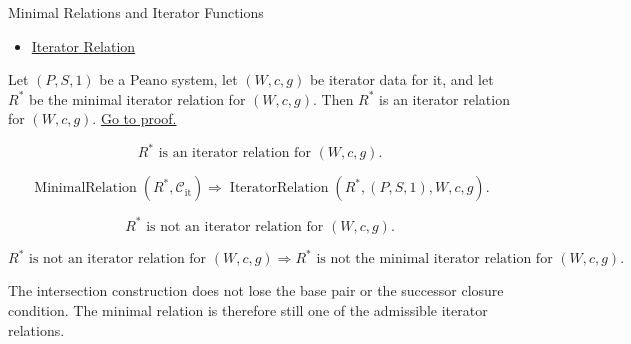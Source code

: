 \begin{topicbox}{Minimal Relations and Iterator Functions}
\begin{remark*}[Dependencies]
\begin{itemize}
  \item \hyperref[def:iterator-relation]{Iterator Relation}
\end{itemize}
\end{remark*}

\begin{tcolorbox}[colback=lembox, colframe=lemborder, arc=2pt,
  left=6pt, right=6pt, top=4pt, bottom=4pt,
  title={\small\textbf{Lemma (Consistency of the Minimal Iterator Relation)}},
  fonttitle=\small\bfseries]
\begin{lemma}
\label{lem:iterator-relation-consistency}
Let $(P,S,1)$ be a Peano system, let $(W,c,g)$ be iterator data for it, and let
$R^*$ be the minimal iterator relation for $(W,c,g)$. Then $R^*$ is an
iterator relation for $(W,c,g)$.
\hyperref[prf:iterator-relation-consistency]{Go to proof.}
\end{lemma}
\end{tcolorbox}

\begin{remark*}
\[
R^* \text{ is an iterator relation for } (W,c,g).
\]
\end{remark*}

\begin{remark*}
\[
\operatorname{MinimalRelation}(R^*,\mathcal C_{\mathrm{it}})
\Longrightarrow
\operatorname{IteratorRelation}(R^*,(P,S,1),W,c,g).
\]
\end{remark*}

\begin{remark*}
\[
R^* \text{ is not an iterator relation for } (W,c,g).
\]
\end{remark*}

\begin{remark*}
\[
R^* \text{ is not an iterator relation for } (W,c,g)
\Longrightarrow
R^* \text{ is not the minimal iterator relation for } (W,c,g).
\]
\end{remark*}

\begin{remark*}[Interpretation]
The intersection construction does not lose the base pair or the successor
closure condition. The minimal relation is therefore still one of the
admissible iterator relations.
\end{remark*}


\end{topicbox}
